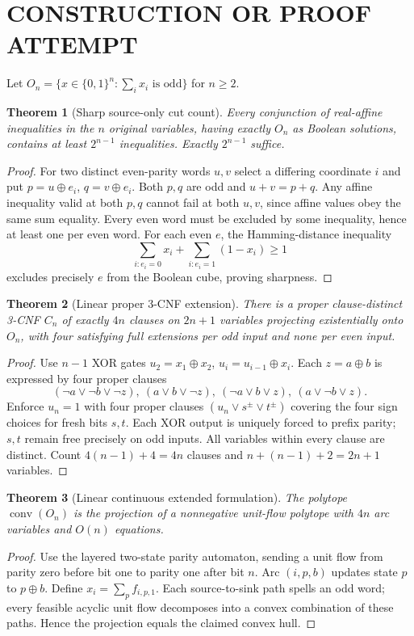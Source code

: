 \documentclass{article}
\newtheorem{theorem}{Theorem}
\begin{document}
\section{CONSTRUCTION OR PROOF ATTEMPT}
Let $O_n=\{x\in\{0,1\}^n:\sum_i x_i\text{ is odd}\}$ for $n\ge2$.
\begin{theorem}[Sharp source-only cut count]
Every conjunction of real-affine inequalities in the $n$ original variables, having exactly $O_n$ as Boolean solutions, contains at least $2^{n-1}$ inequalities. Exactly $2^{n-1}$ suffice.
\end{theorem}
\begin{proof}
For two distinct even-parity words $u,v$ select a differing coordinate $i$ and put $p=u\oplus e_i$, $q=v\oplus e_i$. Both $p,q$ are odd and $u+v=p+q$. Any affine inequality valid at both $p,q$ cannot fail at both $u,v$, since affine values obey the same sum equality. Every even word must be excluded by some inequality, hence at least one per even word. For each even $e$, the Hamming-distance inequality
\[
\sum_{i:e_i=0}x_i+\sum_{i:e_i=1}(1-x_i)\ge1
\]
excludes precisely $e$ from the Boolean cube, proving sharpness.
\end{proof}
\begin{theorem}[Linear proper 3-CNF extension]
There is a proper clause-distinct 3-CNF $C_n$ of exactly $4n$ clauses on $2n+1$ variables projecting existentially onto $O_n$, with four satisfying full extensions per odd input and none per even input.
\end{theorem}
\begin{proof}
Use $n-1$ XOR gates $u_2=x_1\oplus x_2$, $u_i=u_{i-1}\oplus x_i$. Each $z=a\oplus b$ is expressed by four proper clauses
\[
(\neg a\vee\neg b\vee\neg z),\
(a\vee b\vee\neg z),\
(\neg a\vee b\vee z),\
(a\vee\neg b\vee z).
\]
Enforce $u_n=1$ with four proper clauses $(u_n\vee s^{\pm}\vee t^{\pm})$ covering the four sign choices for fresh bits $s,t$. Each XOR output is uniquely forced to prefix parity; $s,t$ remain free precisely on odd inputs. All variables within every clause are distinct. Count $4(n-1)+4=4n$ clauses and $n+(n-1)+2=2n+1$ variables.
\end{proof}
\begin{theorem}[Linear continuous extended formulation]
The polytope $\operatorname{conv}(O_n)$ is the projection of a nonnegative unit-flow polytope with $4n$ arc variables and $O(n)$ equations.
\end{theorem}
\begin{proof}
Use the layered two-state parity automaton, sending a unit flow from parity zero before bit one to parity one after bit $n$. Arc $(i,p,b)$ updates state $p$ to $p\oplus b$. Define $x_i=\sum_p f_{i,p,1}$. Each source-to-sink path spells an odd word; every feasible acyclic unit flow decomposes into a convex combination of these paths. Hence the projection equals the claimed convex hull.
\end{proof}
\end{document}
